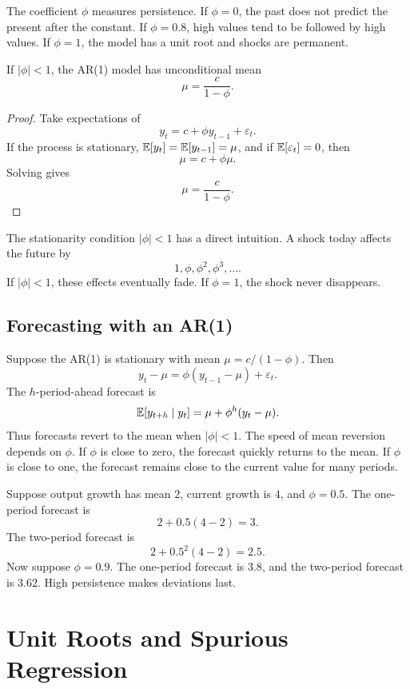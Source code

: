 The coefficient \(\phi\) measures persistence. If \(\phi=0\), the past does not predict the present after the constant. If \(\phi=0.8\), high values tend to be followed by high values. If \(\phi=1\), the model has a unit root and shocks are permanent.

\begin{thmN}[AR(1) mean]
If \(|\phi|<1\), the AR(1) model has unconditional mean
\[
    \mu=\frac{c}{1-\phi}.
\]
\end{thmN}

\begin{proof}
Take expectations of
\[
    y_t=c+\phi y_{t-1}+\varepsilon_t.
\]
If the process is stationary, \(\mathbb{E}[y_t]=\mathbb{E}[y_{t-1}]=\mu\), and if \(\mathbb{E}[\varepsilon_t]=0\), then
\[
    \mu=c+\phi\mu.
\]
Solving gives
\[
    \mu=\frac{c}{1-\phi}.
\]
\end{proof}

The stationarity condition \(|\phi|<1\) has a direct intuition. A shock today affects the future by
\[
    1,\phi,\phi^2,\phi^3,\ldots.
\]
If \(|\phi|<1\), these effects eventually fade. If \(\phi=1\), the shock never disappears.

\subsection{Forecasting with an AR(1)}

Suppose the AR(1) is stationary with mean \(\mu=c/(1-\phi)\). Then
\[
    y_t-\mu=\phi(y_{t-1}-\mu)+\varepsilon_t.
\]
The \(h\)-period-ahead forecast is
\[
    \mathbb{E}[y_{t+h}\mid y_t]
    =
    \mu+\phi^h(y_t-\mu).
\]
Thus forecasts revert to the mean when \(|\phi|<1\). The speed of mean reversion depends on \(\phi\). If \(\phi\) is close to zero, the forecast quickly returns to the mean. If \(\phi\) is close to one, the forecast remains close to the current value for many periods.

\begin{exmp}[Persistence]
Suppose output growth has mean \(2\), current growth is \(4\), and \(\phi=0.5\). The one-period forecast is
\[
    2+0.5(4-2)=3.
\]
The two-period forecast is
\[
    2+0.5^2(4-2)=2.5.
\]
Now suppose \(\phi=0.9\). The one-period forecast is \(3.8\), and the two-period forecast is \(3.62\). High persistence makes deviations last.
\end{exmp}

\section{Unit Roots and Spurious Regression}

